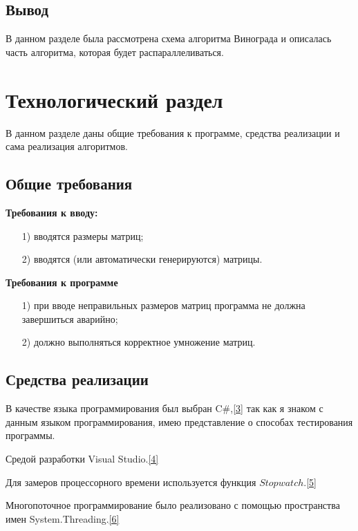 \documentclass[14pt, a4paper]{extarticle}
\begin{document}
\subsection{Вывод}
В данном разделе была рассмотрена схема алгоритма Винограда и описалась часть алгоритма, которая будет распараллеливаться.

\clearpage
\section{Технологический раздел}
В данном разделе даны общие требования к программе, средства реализации и сама реализация алгоритмов.
\subsection{Общие требования}
\textbf{Требования к вводу:}
\begin{enumerate}
	\item[1)] вводятся размеры матриц;
	\item[2)] вводятся (или автоматически генерируются) матрицы. 
\end{enumerate}\par
\textbf{Требования к программе}
\begin{enumerate}
	\item[1)] при вводе неправильных размеров матриц программа не должна завершиться аварийно;
	\item[2)] должно выполняться корректное умножение матриц.
\end{enumerate}
\subsection{Средства реализации}
В качестве языка программирования был выбран C\#,\hyperref[literature]{[3]} так как я знаком с данным языком программирования, имею представление о способах тестирования программы.\par
Средой разработки Visual Studio.\hyperref[literature]{[4]}\par 
Для замеров процессорного времени используется функция $Stopwatch$.\hyperref[literature]{[5]}\par
Многопоточное программирование было реализовано с помощью пространства имен System.Threading.\hyperref[literature]{[6]}
\end{document}
